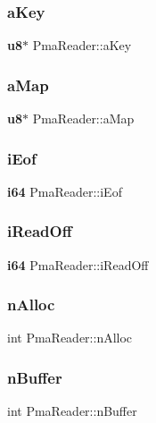 \mbox{\label{struct_pma_reader_af8f5dbc63cbbcbf9ee4c2c462ab1c6ff}} 
\subsubsection{aKey}
{\footnotesize\ttfamily \textbf{ u8}$\ast$ Pma\+Reader\+::a\+Key}

\mbox{\label{struct_pma_reader_ad90dc0ec0c900dd21377c146ac73c73f}} 
\subsubsection{aMap}
{\footnotesize\ttfamily \textbf{ u8}$\ast$ Pma\+Reader\+::a\+Map}

\mbox{\label{struct_pma_reader_a7a2e2745d054cd6d86e1ad57d641b657}} 
\subsubsection{iEof}
{\footnotesize\ttfamily \textbf{ i64} Pma\+Reader\+::i\+Eof}

\mbox{\label{struct_pma_reader_a04a9b631060dcda1d94eb7b16ef8920e}} 
\subsubsection{iReadOff}
{\footnotesize\ttfamily \textbf{ i64} Pma\+Reader\+::i\+Read\+Off}

\mbox{\label{struct_pma_reader_a82522a9128afb8bfb79b88a7c51726ef}} 
\subsubsection{nAlloc}
{\footnotesize\ttfamily int Pma\+Reader\+::n\+Alloc}

\mbox{\label{struct_pma_reader_a422d021b0509c7e5eb2938bba36a5cdd}} 
\subsubsection{nBuffer}
{\footnotesize\ttfamily int Pma\+Reader\+::n\+Buffer}

